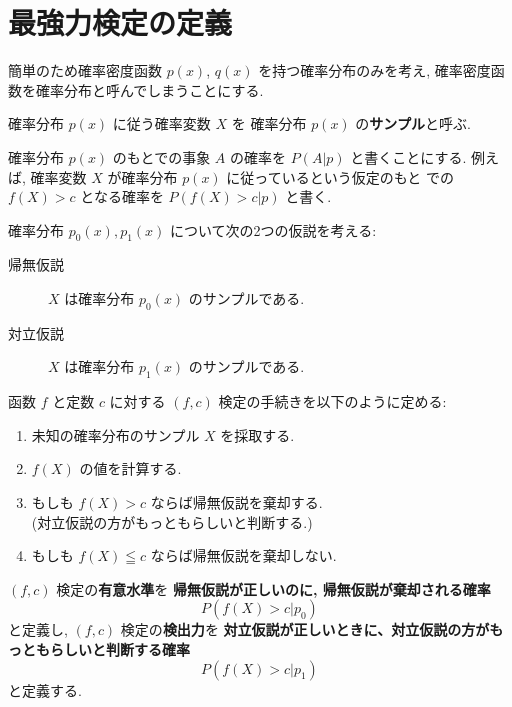 \documentclass[12pt,twoside]{jarticle}
\theoremstyle{jplain}
\theoremstyle{jplain}
\theoremstyle{jplain}
\numberwithin{theorem}{section}
\numberwithin{equation}{section}
\numberwithin{figure}{section}
\numberwithin{table}{section}
\begin{document}
\title{\TITLE}
\author{\AUTHOR}
\date{\DATE}
\maketitle
\begin{abstract}
\ABSTRACT
\end{abstract}
\tableofcontents

\section{最強力検定の定義}

簡単のため確率密度函数 $p(x)$, $q(x)$ を持つ確率分布のみを考え,
確率密度函数を確率分布と呼んでしまうことにする.

確率分布 $p(x)$ に従う確率変数 $X$ を
確率分布 $p(x)$ の{\bfseries サンプル}と呼ぶ.

確率分布 $p(x)$ のもとでの事象 $A$ の確率を $P(A|p)$ と書くことにする.
例えば, 確率変数 $X$ が確率分布 $p(x)$ に従っているという仮定のもと
での $f(X)>c$ となる確率を $P(f(X)>c|p)$ と書く.

確率分布 $p_0(x), p_1(x)$ について次の2つの仮説を考える:
\begin{description}
  \item[帰無仮説] $X$ は確率分布 $p_0(x)$ のサンプルである.
  \item[対立仮説] $X$ は確率分布 $p_1(x)$ のサンプルである.
\end{description}
函数 $f$ と定数 $c$ に対する $(f,c)$ 検定の手続きを以下のように定める:
\begin{enumerate}
  \item 未知の確率分布のサンプル $X$ を採取する.
  \item $f(X)$ の値を計算する.
  \item もしも $f(X)>c$ ならば帰無仮説を棄却する.\\
    (対立仮説の方がもっともらしいと判断する.)
  \item もしも $f(X)\leqq c$ ならば帰無仮説を棄却しない.
\end{enumerate}

$(f,c)$ 検定の{\bfseries 有意水準}を
{\bfseries 帰無仮説が正しいのに, 帰無仮説が棄却される確率}
$$P(f(X) > c|p_0)$$と定義し,
$(f,c)$ 検定の{\bfseries 検出力}を
{\bfseries 対立仮説が正しいときに、対立仮説の方がもっともらしいと判断する確率}
$$P(f(X) > c|p_1)$$と定義する.
\end{document}

